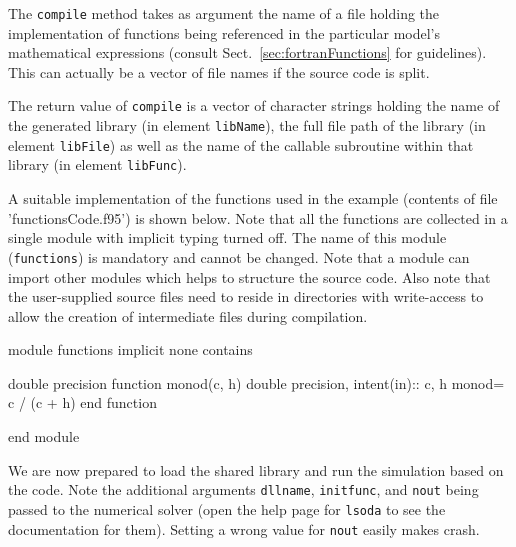 \documentclass[onecolumn]{article}
\begin{document}
The \verb|compile| method takes as argument the name of a file holding the  implementation of functions being referenced in the particular model's mathematical expressions (consult Sect.~\ref{sec:fortranFunctions} for guidelines). This can actually be a vector of file names if the source code is split.

\begin{Schunk}
\end{Schunk}

The return value of \verb|compile| is a vector of character strings holding the name of the generated library (in element \verb|libName|), the full file path of the library (in element \verb|libFile|) as well as the name of the callable subroutine within that library (in element \verb|libFunc|).

A suitable  implementation of the functions used in the example (contents of file 'functionsCode.f95') is shown below. Note that all the functions are collected in a single  module with implicit typing turned off. The name of this module (\verb|functions|) is mandatory and cannot be changed. Note that a module can import other modules which helps to structure the source code. Also note that the user-supplied source files need to reside in directories with write-access to allow the creation of intermediate files during compilation.

\begin{shaded}
\begin{Schunk}
\begin{Soutput}
module functions 
   implicit none 
   contains 
  
   double precision function monod(c, h)  
     double precision, intent(in):: c, h 
     monod= c / (c + h) 
   end function 
  
 end module 
\end{Soutput}
\end{Schunk}
\end{shaded}

We are now prepared to load the shared library and run the simulation based on the  code. Note the additional arguments \verb|dllname|, \verb|initfunc|, and \verb|nout| being passed to the numerical solver (open the help page for \verb|lsoda| to see the documentation for them). Setting a wrong value for \verb|nout| easily makes  crash.
\end{document}
